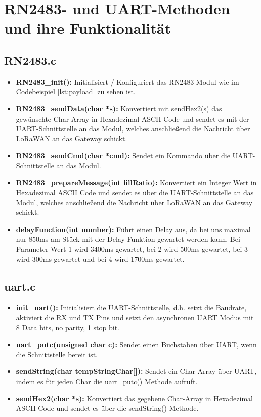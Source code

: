 \section{RN2483- und UART-Methoden und ihre Funktionalität}
\subsection{RN2483.c}
\begin{itemize}
    \item \textbf{RN2483\_init():} Initialisiert / Konfiguriert das RN2483 Modul wie im Codebeispiel \ref{lst:payload} zu sehen ist.
    \item \textbf{RN2483\_sendData(char *s):} Konvertiert mit sendHex2(s) das gewünschte Char-Array in Hexadezimal ASCII Code und sendet es mit der UART-Schnittstelle an das Modul, welches anschließend die Nachricht über LoRaWAN an das Gateway schickt.
    \item \textbf{RN2483\_sendCmd(char *cmd):} Sendet ein Kommando über die UART-Schnittstelle an das Modul.
    \item \textbf{RN2483\_prepareMessage(int fillRatio):} Konvertiert ein Integer Wert in Hexadezimal ASCII Code und sendet es über die UART-Schnittstelle an das Modul, welches anschließend die Nachricht über LoRaWAN an das Gateway schickt.
    \item \textbf{delayFunction(int number):} Führt einen Delay aus, da bei uns maximal nur 850ms am Stück mit der Delay Funktion gewartet werden kann. Bei Parameter-Wert 1 wird 3400ms gewartet, bei 2 wird 500ms gewartet, bei 3 wird 300ms gewartet und bei 4 wird 1700ms gewartet. 
\end{itemize}
\subsection{uart.c}
\begin{itemize}
    \item \textbf{init\_uart():} Initialisiert die UART-Schnittstelle, d.h. setzt die Baudrate, aktiviert die RX und TX Pins und setzt den asynchronen UART Modus mit 8 Data bits, no parity, 1 stop bit. 
    \item \textbf{uart\_putc(unsigned char c):} Sendet einen Buchstaben über UART, wenn die Schnittstelle bereit ist.
    \item \textbf{sendString(char tempStringChar[]):} Sendet ein Char-Array über UART, indem es für jeden Char die uart\_putc() Methode aufruft. 
    \item \textbf{sendHex2(char *s):} Konvertiert das gegebene Char-Array in Hexadezimal ASCII Code und sendet es über die sendString() Methode.
\end{itemize}
\newpage
